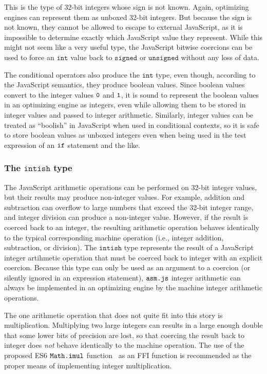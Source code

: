 \documentclass{article}
\newcommand{\mathjs}[1]{\mbox{\texttt{{#1}}}}
\newcommand{\unsigned}{\mathtt{unsigned}}
\newcommand{\signed}{\mathtt{signed}}
\renewcommand{\int}{\mathtt{int}}
\newcommand{\intish}{\mathtt{intish}}
\begin{document}
This is the type of 32-bit integers whose sign is not known. Again,
optimizing engines can represent them as unboxed 32-bit integers. But
because the sign is not known, they cannot be allowed to escape to
external JavaScript, as it is impossible to determine exactly which
JavaScript value they represent. While this might not seem like a very
useful type, the JavaScript bitwise coercions can be used to force an
$\int$ value back to $\signed$ or $\unsigned$ without any loss of
data.

The conditional operators also produce the $\int$ type, even though,
according to the JavaScript semantics, they produce boolean
values. Since boolean values convert to the integer values
$\mathjs{0}$ and $\mathjs{1}$, it is sound to represent the boolean
values in an optimizing engine as integers, even while allowing them
to be stored in integer values and passed to integer
arithmetic. Similarly, integer values can be treated as ``boolish'' in
JavaScript when used in conditional contexts, so it is safe to store
boolean values as unboxed integers even when being used in the test
expression of an $\mathjs{if}$ statement and the like.

\subsubsection*{The $\intish$ type}

The JavaScript arithmetic operations can be performed on 32-bit
integer values, but their results may produce non-integer values. For
example, addition and subtraction can overflow to large numbers that
exceed the 32-bit integer range, and integer division can produce a
non-integer value. However, if the result is coerced back to an
integer, the resulting arithmetic operation behaves identically to the
typical corresponding machine operation (i.e., integer addition,
subtraction, or division). The $\intish$ type represents the result of
a JavaScript integer artihmetic operation that must be coerced back to
integer with an explicit coercion. Because this type can only be used
as an argument to a coercion (or silently ignored in an expression
statement), $\mathjs{asm.js}$ integer arithmetic can always be
implemented in an optimizing engine by the machine integer arithmetic
operations.

The one arithmetic operation that does not quite fit into this story
is multiplication. Multiplying two large integers can results in a
large enough double that some lower bits of precision are lost, so
that coercing the result back to integer does {\it not} behave
identically to the machine operation. The use of the proposed ES6
$\mathjs{Math.imul}$ function~\cite{imul} as an FFI function is
recommended as the proper means of implementing integer
multiplication.
\end{document}
